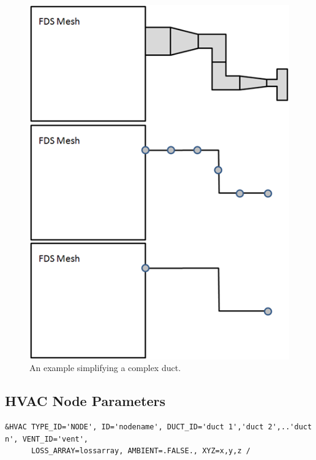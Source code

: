 \documentclass[11pt]{book}
\begin{document}
\begin{figure}[ht]
\includegraphics[width=5in]{FIGURES/hvac-simplify.png}
\caption{An example simplifying a complex duct.}
\label{fig:HVAC_Simplify}
\end{figure}


\subsection{HVAC Node Parameters}
\label{info:HVACnode}

\footnotesize
\begin{verbatim}
&HVAC TYPE_ID='NODE', ID='nodename', DUCT_ID='duct 1','duct 2',..'duct n', VENT_ID='vent',
      LOSS_ARRAY=lossarray, AMBIENT=.FALSE., XYZ=x,y,z /
\end{verbatim}\normalsize
\end{document}

